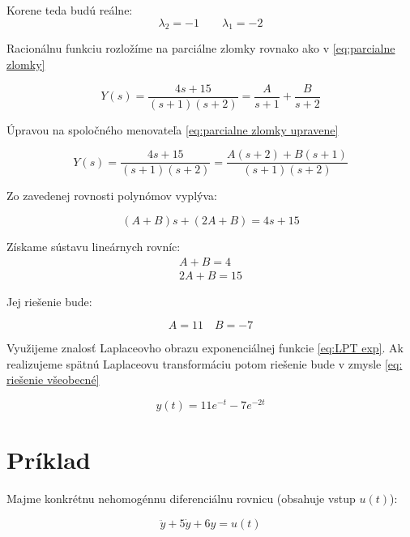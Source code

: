 \documentclass[a4paper,10pt]{article}
\begin{document}
Korene teda budú reálne:
\begin{equation*}
	\lambda_2=-1 \qquad \lambda_1=-2
\end{equation*}


Racionálnu funkciu rozložíme na parciálne zlomky rovnako ako v \eqref{eq:parcialne zlomky}

\begin{equation*}
Y(s)=\frac{4s+15}{(s+1)(s+2)}=\frac{A}{s+1}+\frac{B}{s+2}
\end{equation*}

Úpravou na spoločného menovateľa \eqref{eq:parcialne zlomky upravene}

\begin{equation*}
Y(s)=\frac{4s+15}{(s+1)(s+2)}=\frac{A(s+2)+B(s+1)}{(s+1)(s+2)}
\end{equation*}

Zo zavedenej rovnosti polynómov vyplýva:

\begin{equation*}
(A+B)s+(2A+B)=4s+15
\end{equation*}

Získame sústavu lineárnych rovníc:
\begin{equation*}
\begin{array}{c}
	A+B=4 \\
	2A+B=15
\end{array}
\end{equation*}

Jej riešenie bude:

\begin{equation*}
A=11 \quad B=-7
\end{equation*}

Využijeme znalosť Laplaceovho obrazu exponenciálnej funkcie \eqref{eq:LPT exp}.
Ak realizujeme spätnú Laplaceovu transformáciu potom riešenie bude v zmysle \eqref{eq: riešenie všeobecné}

\begin{equation*}
y(t)=11e^{-t}-7e^{-2t}
\end{equation*}

\pagebreak

\section{Príklad}
Majme konkrétnu nehomogénnu diferenciálnu rovnicu (obsahuje vstup $u(t)$):

\begin{equation*}
\ddot{y}+5\dot{y}+6y=u(t) 
\end{equation*}
\end{document}

